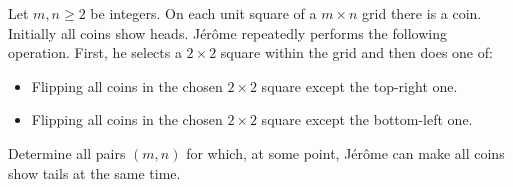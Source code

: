 Let $m,n \geq 2$ be integers.
On each unit square of a $m \times n$ grid there is a coin.
Initially all coins show heads. Jérôme repeatedly performs the following operation.
First, he selects a $2 \times 2$ square within the grid and then does one of:
\begin{itemize}
    \item Flipping all coins in the chosen $2 \times 2$ square except the top-right one.
    \item Flipping all coins in the chosen $2 \times 2$ square except the bottom-left one.
\end{itemize}
Determine all pairs $(m,n)$ for which, at some point, Jérôme can make all coins show tails at the same time.
